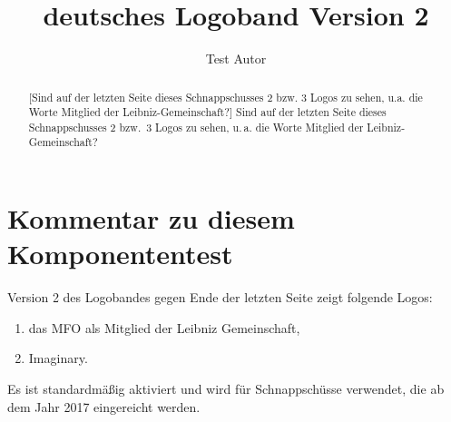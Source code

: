 \documentclass{snapshotmfo}
\author{Test Autor}
\title{deutsches Logoband Version 2}
\begin{document}
\begin{abstract}[Sind auf der letzten Seite dieses Schnappschusses 2 bzw. 3 Logos zu sehen, u.a. die Worte \glqq Mitglied der Leibniz-Gemeinschaft\grqq ?]
Sind auf der letzten Seite dieses Schnappschusses 2 bzw.\ 3 Logos zu sehen, u.\,a. die Worte \glqq Mitglied der Leibniz-Gemeinschaft\grqq ?
\end{abstract}

\section{Kommentar zu diesem Komponententest}
Version 2 des Logobandes gegen Ende der letzten Seite zeigt folgende Logos:
\begin{enumerate}
  \item das MFO als Mitglied der Leibniz Gemeinschaft,
  \item Imaginary.
\end{enumerate}
Es ist standardmäßig aktiviert
und wird für Schnappschüsse verwendet, die ab dem Jahr 2017 eingereicht werden.
\end{document}
